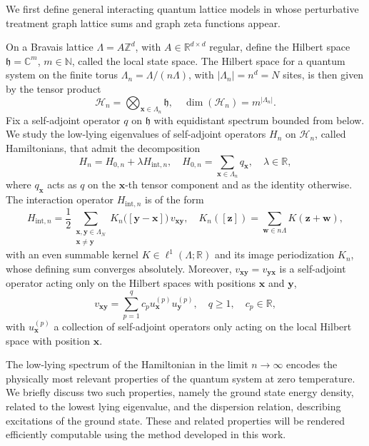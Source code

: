 \documentclass[]{amsart}
\numberwithin{mythm}{section}
\begin{document}
We first define general interacting quantum lattice models in whose perturbative treatment graph lattice sums and graph zeta functions appear. 
\begin{definition}
\label{def:quantum-model}
On a Bravais lattice $\Lambda=A\mathds Z^d$, with $A\in\mathds R^{d\times d}$ regular, define the Hilbert space $\mathfrak h=\mathds C^m$, $m\in\mathds N$, called the local state space. The Hilbert space for a quantum system on the finite torus $\Lambda_n=\Lambda/(n\Lambda)$, with $|\Lambda_n|=n^d=N$ sites, is then
given by the tensor product
\[
\mathcal H_n = \bigotimes_{\bm x\in \Lambda_n} \mathfrak{h},\quad
\dim(\mathcal H_n) = m^{|\Lambda_n|}.
\]
Fix a self-adjoint operator $q$ on $\mathfrak h$ with equidistant spectrum bounded from below. We study the low-lying eigenvalues of self-adjoint operators $H_n$ on $\mathcal H_n$, called Hamiltonians, that admit the decomposition
\[
H_n= H_{0,n}+\lambda H_{\mathrm{int},n},\quad
H_{0,n}=\sum_{\bm x\in \Lambda_n} q_{\bm x},
\quad \lambda\in\mathds R,
\]
where $q_{\bm x}$ acts as $q$ on the $\bm x$-th tensor component and as the identity otherwise. The interaction operator $H_{\mathrm{int},n}$ is of the form
\[
H_{\mathrm{int},n} = \frac{1}{2}
\sum_{\substack{\bm x,\bm y\in \Lambda_N\\ \bm x\neq\bm y}}
K_n\big([\bm y-\bm x]\big)\, v_{\bm x\bm y},\quad
K_n([\bm z]) = \sum_{\bm w\in n\Lambda} K(\bm z+\bm w),
\]
with an even summable kernel $K\in \ell^1(\Lambda;\mathds R)$ and its image periodization $K_n$, whose defining sum converges absolutely. Moreover, $v_{\bm x\bm y}=v_{\bm y\bm x}$ is a self-adjoint operator acting only on the Hilbert spaces with positions $\bm x$ and $\bm y$, 
\[
v_{\bm x\bm y} = \sum_{p=1}^q c_p u^{(p)}_{\bm x} u^{(p)}_{\bm y},\quad q\ge 1,\quad c_p\in \mathds R,
\]
with $u_{\bm x}^{(p)}$ a collection of self-adjoint operators only acting on the local Hilbert space with position $\bm x$.
\end{definition}

The low-lying spectrum of the Hamiltonian in the limit $n\to \infty$ encodes the physically most relevant properties of the quantum system at zero temperature. We briefly discuss two such properties, namely the ground state energy density, related to the lowest lying eigenvalue, and the dispersion relation, describing excitations of the ground state. These and related properties will be rendered efficiently computable using the method developed in this work.  
\end{document}
